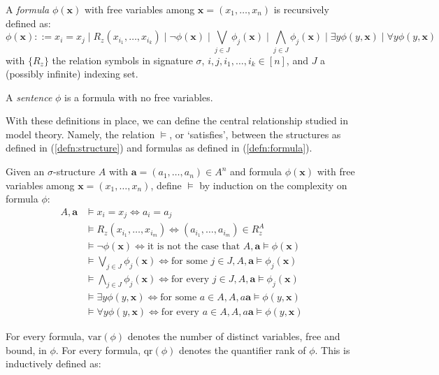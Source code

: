 \begin{defn}
A \textit{formula} $\phi(\mathbf{x})$ with free variables among $\mathbf{x} = (x_{1},\dots,x_{n})$ is recursively defined as: 
$$ \phi(\mathbf{x}) ::= x_{i} = x_{j} \mid R_{z}(x_{i_{1}},\dots,x_{i_{k}}) \mid \neg \phi(\mathbf{x}) \mid \bigvee_{j \in J} \phi_{j}(\mathbf{x}) \mid \bigwedge_{j \in J} \phi_{j}(\mathbf{x}) \mid \exists y \phi(y,\mathbf{x}) \mid \forall y \phi(y,\mathbf{x})$$
with $\{R_{z}\}$ the relation symbols in signature $\sigma$, $i,j,i_{1},\dots,i_{k} \in [n]$, and $J$ a (possibly infinite) indexing set.  
\label{defn:formula}
\end{defn}
\begin{defn}
A \textit{sentence} $\phi$ is a formula with no free variables.
\end{defn}
With these definitions in place, we can define the central relationship studied in model theory. Namely, the relation $\vDash$, or `satisfies', between the structures as defined in (\ref{defn:structure}) and formulas as defined in (\ref{defn:formula}).
\begin{defn}
Given an $\sigma$-structure $A$ with $\mathbf{a} = (a_{1},\dots,a_{n}) \in A^{n}$ and formula $\phi(\mathbf{x})$ with free variables among $\mathbf{x} = (x_{1},\dots,x_{n})$, define $\vDash$ by induction on the complexity on formula $\phi$:
\begin{align*}
A,\mathbf{a} &\vDash x_{i} = x_{j} \Leftrightarrow a_{i} = a_{j} \\
 &\vDash R_{z}(x_{i_{1}},\dots,x_{i_{m}}) \Leftrightarrow (a_{i_{1}},\dots,a_{i_{m}}) \in R_{z}^{A} \\
 &\vDash \neg \phi(\mathbf{x}) \Leftrightarrow \text{it is not the case that } A,\mathbf{a} \vDash \phi(\mathbf{x}) \\
 &\vDash \bigvee_{j \in J} \phi_{j}(\mathbf{x}) \Leftrightarrow \text{for some } j \in J,  A,\mathbf{a} \vDash \phi_{j}(\mathbf{x}) \\
 &\vDash \bigwedge_{j \in J} \phi_{j}(\mathbf{x}) \Leftrightarrow \text{for every } j \in J,  A,\mathbf{a} \vDash \phi_{j}(\mathbf{x}) \\
 &\vDash \exists y \phi(y,\mathbf{x}) \Leftrightarrow \text{for some } a \in A,  A,a\mathbf{a} \vDash \phi(y,\mathbf{x}) \\
 &\vDash \forall y \phi(y,\mathbf{x}) \Leftrightarrow \text{for every } a \in A,  A,a\mathbf{a} \vDash \phi(y,\mathbf{x}) 
\end{align*}
\end{defn}
For every formula, $\text{var}(\phi)$ denotes the number of distinct variables, free and bound, in $\phi$. For every formula, $\text{qr}(\phi)$ denotes the quantifier rank of $\phi$. This is inductively defined as:
